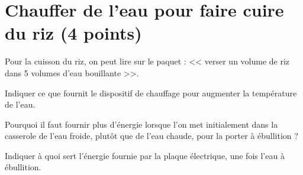 \section{Chauffer de l'eau pour faire cuire du riz (4 points)}

Pour la cuisson du riz, on peut lire sur le paquet : << verser un volume de riz dans 5 volumes d'eau bouillante >>.

\begin{questions}
	\question[1\half] Indiquer ce que fournit le dispositif de chauffage pour augmenter la température de l'eau.
	
	\question[1\half] Pourquoi il faut fournir plus d'énergie lorsque l'on met initialement dans la casserole de l'eau froide, plutôt que de l'eau chaude, pour la porter à ébullition ?
	
	\question[1] Indiquer à quoi sert l'énergie fournie par la plaque électrique, une fois l'eau à ébullition.
\end{questions}